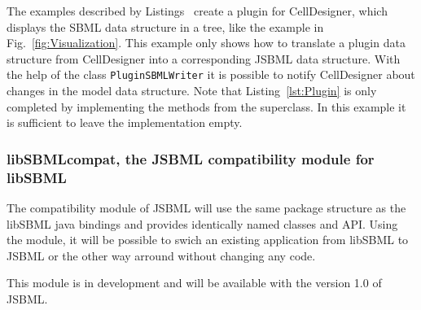The examples described by Listings~
create a plugin for CellDesigner, which displays the SBML data structure
in a tree, like the example in Fig.~\vref{fig:Visualization}. This example only
shows how to translate a plugin data structure
from CellDesigner into a corresponding JSBML data structure. With the help of
the class \texttt{PluginSBMLWriter} it is possible to notify CellDesigner about
changes in the model data structure. Note that Listing~\vref{lst:Plugin} is only
completed by implementing the methods from the superclass. In this example it
is sufficient to leave the implementation empty.


\subsubsection{libSBMLcompat, the JSBML compatibility module for libSBML}

The compatibility module of JSBML will use the same package structure as the
libSBML java bindings and provides identically named classes and API. Using the
module, it will be possible to swich an existing application from libSBML to
JSBML or the other way arround without changing any code.

This module is in development and will be available with the version 1.0 of
JSBML.
%
